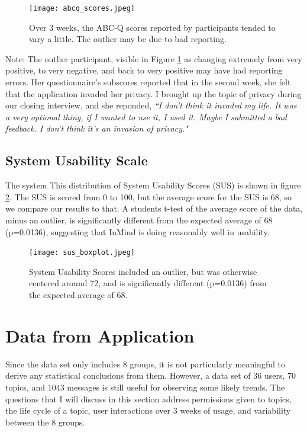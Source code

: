     \begin{figure}
    \centering
    \texttt{[image: abcq\_scores.jpeg]}
    \caption[Affective Benefits and Costs Questionnaire Results]{
      Over 3 weeks, the ABC-Q scores reported by participants tended to vary
      a little.
      The outlier may be due to bad reporting.
    }
    \label{fig:abcq_results}
    \end{figure}

  Note: The outlier participant, visible in Figure \ref{fig:abcq_results}
  as changing extremely from very positive,
  to very negative, and back to very positive may have had reporting errors.
  Her questionnaire's subscores reported that in the second week,
  she felt that the application invaded her privacy.
  I brought up the topic of privacy during our closing interview, and she reponded,
  \textit{
  ``I don't think it invaded my life. It was a very optional thing,
  if I wanted to use it, I used it. Maybe I submitted a bad feedback.
  I don't think it's an invasion of privacy."
  }

  \subsection{System Usability Scale}
  The system
  This distribution of System Usability Scores (SUS) is shown in figure
  \ref{fig:sus_results}.
  The SUS is scored from 0 to 100, but the average score for the SUS is 68,
  so we compare our results to that.
  A students t-test of the average score of the data, minus an outlier,
  is significantly  different from the expected average of 68 (p=0.0136),
  suggesting that InMind is doing reasonably well in usability.

    \begin{figure}
    \centering
    \texttt{[image: sus\_boxplot.jpeg]}
    \caption[System Usability Scale Results]{
      System Usability Scores included an outlier,
      but was otherwise centered around 72,
      and is significantly different (p=0.0136) from the expected average of 68.
    }
    \label{fig:sus_results}
    \end{figure}

\section{Data from Application}
  Since the data set only includes 8 groups,
  it is not particularly meaningful to derive any statistical conclusions
  from them.
  However, a data set of 36 users, 70 topics, and 1043 messages
  is still useful for observing some likely trends.
  The questions that I will discuss in this section address
  permissions given to topics, the life cycle of a topic,
  user interactions over 3 weeks of usage,
  and variability between the 8 groups.

